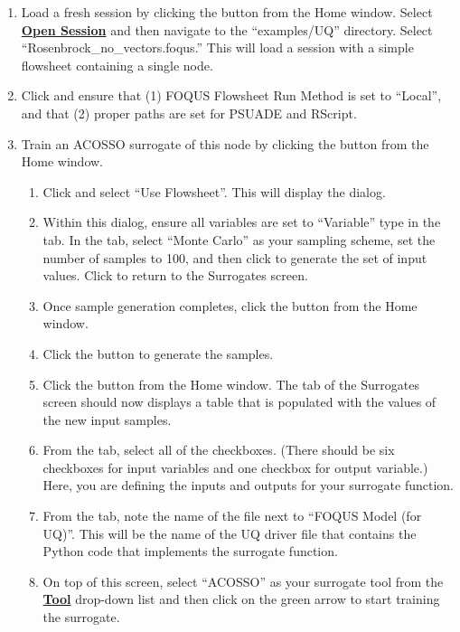\begin{enumerate}
\item{Load a fresh session by clicking the  button from the Home window. Select \textbf{\underline{Open Session}} and then navigate to the ``examples/UQ''
  directory. Select ``Rosenbrock\_no\_vectors.foqus.'' This will load a
  session with a simple flowsheet containing a single node.}
\item{Click  and ensure that (1) FOQUS Flowsheet Run Method is
  set to ``Local'', and that (2) proper paths are set for PSUADE and RScript.} 
\item{Train an ACOSSO surrogate of this node by clicking the
   button from the Home window.
\begin{enumerate}
\item{Click  and select ``Use Flowsheet''. This will
  display the  dialog.}
\item{Within this dialog, ensure all variables are set to ``Variable''
  type in the  tab. In the  tab,
  select ``Monte Carlo'' as your sampling scheme, set the number of
  samples to 100, and then click  to generate the
  set of input values. Click  to return to the Surrogates screen.}
\item{Once sample generation completes, click the  button from the Home window.}
\item{Click the 	button to generate the samples.}
\item{Click the  button from the Home window. The  tab of the Surrogates
  screen should now displays a  table that is populated with
  the values of the new input samples.}
\item{From the  tab, select all of the checkboxes. (There should
  be six checkboxes for input variables and one checkbox for output variable.) 
  Here, you are defining the inputs and outputs for your surrogate function.}
\item{From the  tab, note the name of the file next to
  ``FOQUS Model (for UQ)''. This will be the name of the UQ driver file
  that contains the Python code that implements the surrogate function.}
\item{On top of this screen, select ``ACOSSO'' as your surrogate tool from the \textbf{\underline{Tool}} drop-down list and then click on the green arrow to start training the surrogate.}

\end{enumerate}}
\end{enumerate}
